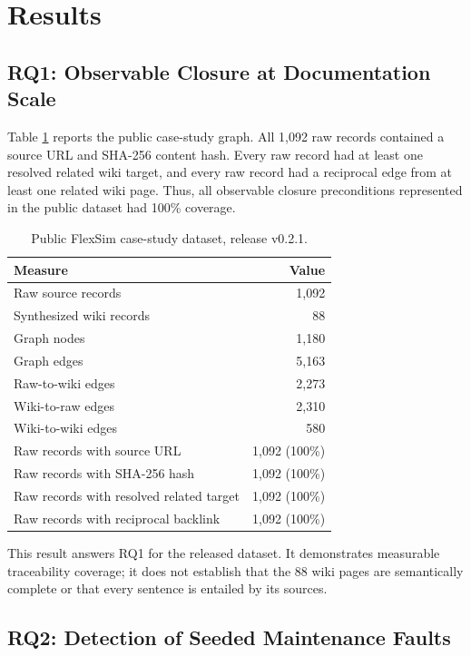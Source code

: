 \documentclass[preprint,12pt,a4paper]{elsarticle}
\begin{document}
\section{Results}

\subsection{RQ1: Observable Closure at Documentation Scale}

Table \ref{tab:dataset} reports the public case-study graph. All 1,092 raw
records contained a source URL and SHA-256 content hash. Every raw record had at
least one resolved related wiki target, and every raw record had a reciprocal
edge from at least one related wiki page. Thus, all observable closure
preconditions represented in the public dataset had 100\% coverage.

\begin{table}[H]
\centering
\small
\begin{tabular}{lr}
\toprule
Measure & Value \\
\midrule
Raw source records & 1,092 \\
Synthesized wiki records & 88 \\
Graph nodes & 1,180 \\
Graph edges & 5,163 \\
Raw-to-wiki edges & 2,273 \\
Wiki-to-raw edges & 2,310 \\
Wiki-to-wiki edges & 580 \\
Raw records with source URL & 1,092 (100\%) \\
Raw records with SHA-256 hash & 1,092 (100\%) \\
Raw records with resolved related target & 1,092 (100\%) \\
Raw records with reciprocal backlink & 1,092 (100\%) \\
\bottomrule
\end{tabular}
\caption{Public FlexSim case-study dataset, release v0.2.1.}
\label{tab:dataset}
\end{table}

This result answers RQ1 for the released dataset. It demonstrates measurable
traceability coverage; it does not establish that the 88 wiki pages are
semantically complete or that every sentence is entailed by its sources.

\subsection{RQ2: Detection of Seeded Maintenance Faults}
\end{document}
